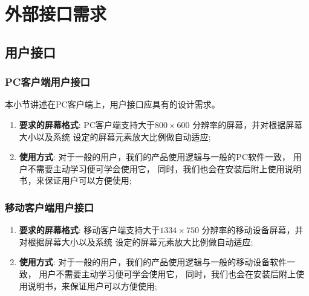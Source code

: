 \section{外部接口需求}
\subsection{用户接口}
\label{ssec:ui}

\subsubsection{PC客户端用户接口} %
本小节讲述在PC客户端上，用户接口应具有的设计需求。

\begin{enumerate}
	\item \textbf{要求的屏幕格式}:
		PC客户端支持大于$800 \times 600$ 分辨率的屏幕，并对根据屏幕大小以及系统
		设定的屏幕元素放大比例做自动适应;
	\item \textbf{使用方式}:
		对于一般的用户，我们的产品使用逻辑与一般的PC软件一致，
			用户不需要主动学习便可学会使用它，
		同时，我们也会在安装后附上使用说明书，来保证用户可以方便使用;
\end{enumerate}



\subsubsection{移动客户端用户接口} %

\begin{enumerate}
	\item \textbf{要求的屏幕格式}:
		移动客户端支持大于$1334 \times 750$ 分辨率的移动设备屏幕，并对根据屏幕大小以及系统
		设定的屏幕元素放大比例做自动适应;
	\item \textbf{使用方式}:
		对于一般的用户，我们的产品使用逻辑与一般的移动设备软件一致，
			用户不需要主动学习便可学会使用它，
		同时，我们也会在安装后附上使用说明书，来保证用户可以方便使用;
\end{enumerate}

\iffalse
{}


